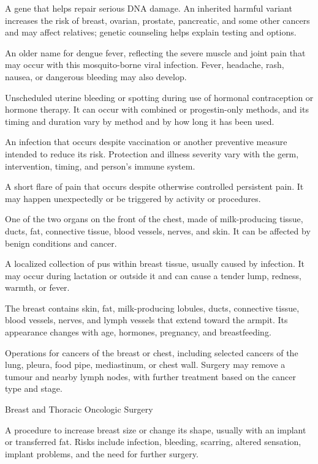  A gene that helps repair serious DNA damage. An inherited harmful variant increases the risk of breast, ovarian, prostate, pancreatic, and some other cancers and may affect relatives; genetic counseling helps explain testing and options.

 An older name for dengue fever, reflecting the severe muscle and joint pain that may occur with this mosquito-borne viral infection. Fever, headache, rash, nausea, or dangerous bleeding may also develop.

 Unscheduled uterine bleeding or spotting during use of hormonal contraception or hormone therapy. It can occur with combined or progestin-only methods, and its timing and duration vary by method and by how long it has been used.

 An infection that occurs despite vaccination or another preventive measure intended to reduce its risk. Protection and illness severity vary with the germ, intervention, timing, and person's immune system.

 A short flare of pain that occurs despite otherwise
controlled persistent pain. It may happen unexpectedly or be triggered by
activity or procedures.

 One of the two organs on the front of the chest, made of milk-producing tissue, ducts, fat, connective tissue, blood vessels, nerves, and skin. It can be affected by benign conditions and cancer.

 A localized collection of pus within breast tissue, usually caused by infection. It may occur during lactation or outside it and can cause a tender lump, redness, warmth, or fever.

 The breast contains skin, fat, milk-producing lobules, ducts, connective tissue, blood vessels, nerves, and lymph vessels that extend toward the armpit. Its appearance changes with age, hormones, pregnancy, and breastfeeding.

 Operations for cancers of the breast or chest, including selected cancers of the lung, pleura, food pipe, mediastinum, or chest wall. Surgery may remove a tumour and nearby lymph nodes, with further treatment based on the cancer type and stage.

\synonyms
Breast and Thoracic Oncologic Surgery

 A procedure to increase breast size or change its shape, usually with an implant or transferred fat. Risks include infection, bleeding, scarring, altered sensation, implant problems, and the need for further surgery.

